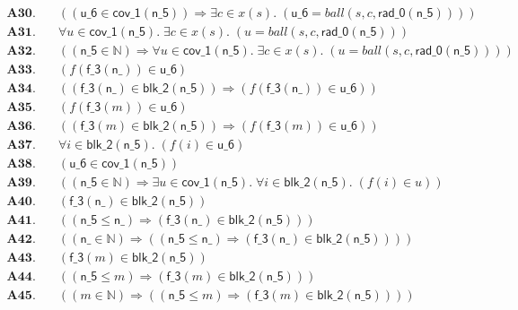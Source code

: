 \documentclass[11pt]{article}
\begin{document}
\begin{align*}
  \mathbf{A30.}\quad & ((\mathsf{u\_6} \in \mathsf{cov\_1}(\mathsf{n\_5})) \Rightarrow \exists c \in x(s).\; (\mathsf{u\_6} = \mathit{ball}(s, c, \mathsf{rad\_0}(\mathsf{n\_5})))) \\
  \mathbf{A31.}\quad & \forall u \in \mathsf{cov\_1}(\mathsf{n\_5}).\; \exists c \in x(s).\; (u = \mathit{ball}(s, c, \mathsf{rad\_0}(\mathsf{n\_5}))) \\
  \mathbf{A32.}\quad & ((\mathsf{n\_5} \in \mathbb{N}) \Rightarrow \forall u \in \mathsf{cov\_1}(\mathsf{n\_5}).\; \exists c \in x(s).\; (u = \mathit{ball}(s, c, \mathsf{rad\_0}(\mathsf{n\_5})))) \\
  \mathbf{A33.}\quad & (f(\mathsf{f\_3}(\mathsf{n\_})) \in \mathsf{u\_6}) \\
  \mathbf{A34.}\quad & ((\mathsf{f\_3}(\mathsf{n\_}) \in \mathsf{blk\_2}(\mathsf{n\_5})) \Rightarrow (f(\mathsf{f\_3}(\mathsf{n\_})) \in \mathsf{u\_6})) \\
  \mathbf{A35.}\quad & (f(\mathsf{f\_3}(m)) \in \mathsf{u\_6}) \\
  \mathbf{A36.}\quad & ((\mathsf{f\_3}(m) \in \mathsf{blk\_2}(\mathsf{n\_5})) \Rightarrow (f(\mathsf{f\_3}(m)) \in \mathsf{u\_6})) \\
  \mathbf{A37.}\quad & \forall i \in \mathsf{blk\_2}(\mathsf{n\_5}).\; (f(i) \in \mathsf{u\_6}) \\
  \mathbf{A38.}\quad & (\mathsf{u\_6} \in \mathsf{cov\_1}(\mathsf{n\_5})) \\
  \mathbf{A39.}\quad & ((\mathsf{n\_5} \in \mathbb{N}) \Rightarrow \exists u \in \mathsf{cov\_1}(\mathsf{n\_5}).\; \forall i \in \mathsf{blk\_2}(\mathsf{n\_5}).\; (f(i) \in u)) \\
  \mathbf{A40.}\quad & (\mathsf{f\_3}(\mathsf{n\_}) \in \mathsf{blk\_2}(\mathsf{n\_5})) \\
  \mathbf{A41.}\quad & ((\mathsf{n\_5} \leq \mathsf{n\_}) \Rightarrow (\mathsf{f\_3}(\mathsf{n\_}) \in \mathsf{blk\_2}(\mathsf{n\_5}))) \\
  \mathbf{A42.}\quad & ((\mathsf{n\_} \in \mathbb{N}) \Rightarrow ((\mathsf{n\_5} \leq \mathsf{n\_}) \Rightarrow (\mathsf{f\_3}(\mathsf{n\_}) \in \mathsf{blk\_2}(\mathsf{n\_5})))) \\
  \mathbf{A43.}\quad & (\mathsf{f\_3}(m) \in \mathsf{blk\_2}(\mathsf{n\_5})) \\
  \mathbf{A44.}\quad & ((\mathsf{n\_5} \leq m) \Rightarrow (\mathsf{f\_3}(m) \in \mathsf{blk\_2}(\mathsf{n\_5}))) \\
  \mathbf{A45.}\quad & ((m \in \mathbb{N}) \Rightarrow ((\mathsf{n\_5} \leq m) \Rightarrow (\mathsf{f\_3}(m) \in \mathsf{blk\_2}(\mathsf{n\_5})))) \\

\end{align*}
\end{document}

